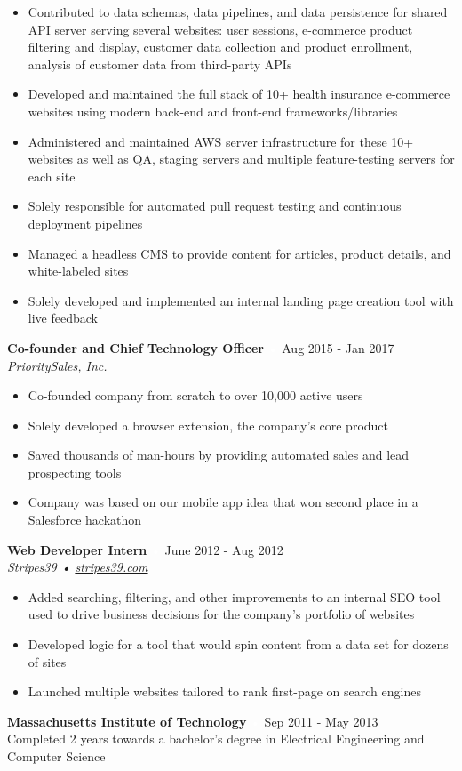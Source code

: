 \documentclass{resume}
\begin{document}
\nointerlineskip
\begin{itemize}
	\item Contributed to data schemas, data pipelines, and data persistence for shared API server serving several websites: user sessions, e-commerce product filtering and display, customer data collection and product enrollment, analysis of customer data from third-party APIs
	\item Developed and maintained the full stack of 10+ health insurance e-commerce websites using modern back-end and front-end frameworks/libraries
	\item Administered and maintained AWS server infrastructure for these 10+ websites as well as QA, staging servers and multiple feature-testing servers for each site
	\item Solely responsible for automated pull request testing and continuous deployment pipelines
	\item Managed a headless CMS to provide content for articles, product details, and white-labeled sites
	\item Solely developed and implemented an internal landing page creation tool with live feedback
\end{itemize}

\textbf{Co-founder and Chief Technology Officer}
\hfill{\textcolor{white}{•} Aug 2015 - Jan 2017}\\
\textit{PrioritySales, Inc.}

\nointerlineskip
\begin{itemize}
	\item Co-founded company from scratch to over 10,000 active users
	\item Solely developed a browser extension, the company's core product
	\item Saved thousands of man-hours by providing automated sales and lead prospecting tools
	\item Company was based on our mobile app idea that won second place in a Salesforce hackathon
\end{itemize}

\textbf{Web Developer Intern}
\hfill{\textcolor{white}{•} June 2012 - Aug 2012}\\
\textit{Stripes39 • \href{https://www.stripes39.com}{stripes39.com}}

\nointerlineskip
\begin{itemize}
	\item Added searching, filtering, and other improvements to an internal SEO tool used to drive business decisions for the company's portfolio of websites
	\item Developed logic for a tool that would spin content from a data set for dozens of sites
	\item Launched multiple websites tailored to rank first-page on search engines
\end{itemize}

\bigskip

\colorbox{headerbg3}{\hspace{\linewidth}\hspace{-2\fboxsep}}

\textbf{Massachusetts Institute of Technology}
\hfill{\textcolor{white}{•} Sep 2011 - May 2013}\\
Completed 2 years towards a bachelor's degree in Electrical Engineering and Computer Science
\end{document}
